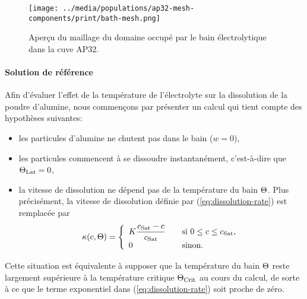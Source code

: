 \begin{figure}[h!]
  \begin{center}
    \texttt{[image: ../media/populations/ap32-mesh-components/print/bath-mesh.png]}
    \caption{Aperçu du maillage du domaine occupé par le bain
      électrolytique dans la cuve AP32.}
    \label{fig:bath-mesh}
  \end{center}
\end{figure}

\paragraph{Solution de référence} Afin d'évaluer l'effet de la
température de l'électrolyte sur la dissolution de la poudre
d'alumine, nous commençons par présenter un calcul qui tient compte
des hypothèses suivantes:
\begin{itemize}
\item les particules d'alumine ne chutent pas dans le bain ($w = 0$),
\item les particules commencent à se dissoudre instantanément, c'est-à-dire que $\Theta_\text{Lat} = 0$,
\item la vitesse de dissolution ne dépend pas de la température du
  bain $\Theta$. Plus précisément, la vitesse de dissolution
  définie par (\ref{eq:dissolution-rate}) est remplacée par
\begin{equation}
  \kappa(c, \Theta)= \left\{
  \begin{array}{ll}
    K\displaystyle\frac{c_\text{Sat} - c}{c_\text{Sat}} &\quad \text{si } 0\leq
    c \leq c_\text{Sat},\\
    0& \quad \text{sinon}.
  \end{array}
  \right.
\end{equation}
\end{itemize}
Cette situation est équivalente à supposer que la température du
bain $\Theta$ reste largement supérieure à la température
critique $\Theta_\text{Crit}$ au cours du calcul, de sorte à ce que le terme
exponentiel dans (\ref{eq:dissolution-rate}) soit proche de zéro.

